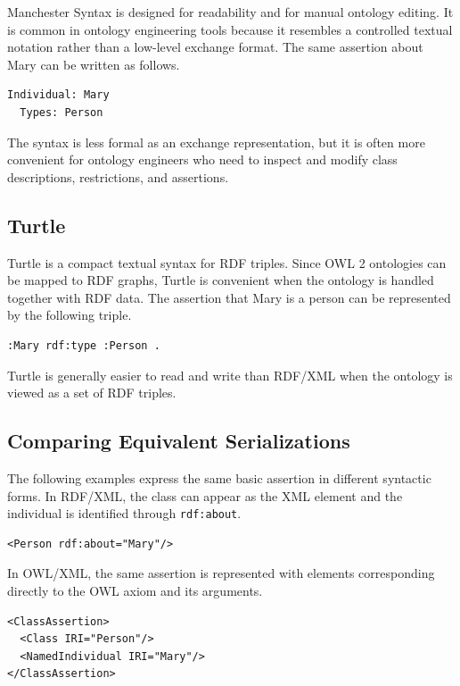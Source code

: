 \documentclass{scrbook}
\begin{document}
	Manchester Syntax is designed for readability and for manual ontology editing. It is common in ontology engineering tools because it resembles a controlled textual notation rather than a low-level exchange format. The same assertion about Mary can be written as follows.
	
	\begin{lstlisting}
Individual: Mary
  Types: Person
	\end{lstlisting}
	
	The syntax is less formal as an exchange representation, but it is often more convenient for ontology engineers who need to inspect and modify class descriptions, restrictions, and assertions.
	
	\subsection{Turtle}
	
	Turtle is a compact textual syntax for RDF triples. Since OWL 2 ontologies can be mapped to RDF graphs, Turtle is convenient when the ontology is handled together with RDF data. The assertion that Mary is a person can be represented by the following triple.
	
	\begin{lstlisting}
:Mary rdf:type :Person .
	\end{lstlisting}
	
	Turtle is generally easier to read and write than RDF/XML when the ontology is viewed as a set of RDF triples.
	
	\subsection{Comparing Equivalent Serializations}
	
	The following examples express the same basic assertion in different syntactic forms. In RDF/XML, the class can appear as the XML element and the individual is identified through \texttt{rdf:about}.
	
	\begin{lstlisting}
<Person rdf:about="Mary"/>
	\end{lstlisting}
	
	In OWL/XML, the same assertion is represented with elements corresponding directly to the OWL axiom and its arguments.
	
	\begin{lstlisting}
<ClassAssertion>
  <Class IRI="Person"/>
  <NamedIndividual IRI="Mary"/>
</ClassAssertion>
	\end{lstlisting}
	
\end{document}

